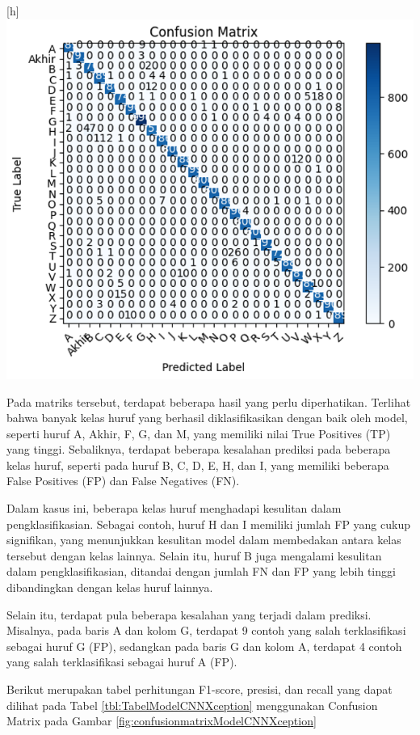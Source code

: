 \begin{center}[h]
	\includegraphics[width=0.7\linewidth]{gambar/bener/ConfusionMatrix_ModelXception.png}
	\label{fig:confusionmatrixModelCNNXception}
\end{center}

Pada matriks tersebut, terdapat beberapa hasil yang perlu diperhatikan. Terlihat bahwa banyak kelas huruf yang berhasil diklasifikasikan dengan baik oleh model, seperti huruf A, Akhir, F, G, dan M, yang memiliki nilai True Positives (TP) yang tinggi. Sebaliknya, terdapat beberapa kesalahan prediksi pada beberapa kelas huruf, seperti pada huruf B, C, D, E, H, dan I, yang memiliki beberapa False Positives (FP) dan False Negatives (FN).

Dalam kasus ini, beberapa kelas huruf menghadapi kesulitan dalam pengklasifikasian. Sebagai contoh, huruf H dan I memiliki jumlah FP yang cukup signifikan, yang menunjukkan kesulitan model dalam membedakan antara kelas tersebut dengan kelas lainnya. Selain itu, huruf B juga mengalami kesulitan dalam pengklasifikasian, ditandai dengan jumlah FN dan FP yang lebih tinggi dibandingkan dengan kelas huruf lainnya.

Selain itu, terdapat pula beberapa kesalahan yang terjadi dalam prediksi. Misalnya, pada baris A dan kolom G, terdapat 9 contoh yang salah terklasifikasi sebagai huruf G (FP), sedangkan pada baris G dan kolom A, terdapat 4 contoh yang salah terklasifikasi sebagai huruf A (FP).

Berikut merupakan tabel perhitungan F1-score, presisi, dan recall yang dapat dilihat pada Tabel \ref{tbl:TabelModelCNNXception} menggunakan Confusion Matrix pada Gambar \ref{fig:confusionmatrixModelCNNXception}

